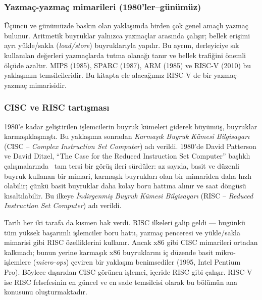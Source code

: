 \subsubsection*{Yazmaç-yazmaç mimarileri (1980'ler--günümüz)}
Üçüncü ve günümüzde baskın olan yaklaşımda birden çok genel amaçlı yazmaç bulunur. Aritmetik buyruklar yalnızca yazmaçlar arasında çalışır; bellek erişimi ayrı yükle/sakla (\emph{load/store}) buyruklarıyla yapılır. Bu ayrım, derleyiciye sık kullanılan değerleri yazmaçlarda tutma olanağı tanır ve bellek trafiğini önemli ölçüde azaltır. MIPS (1985), SPARC (1987), ARM (1985) ve RISC-V (2010) bu yaklaşımın temsilcileridir. Bu kitapta ele alacağımız RISC-V de bir yazmaç-yazmaç mimarisidir.

\subsubsection*{CISC ve RISC tartışması}
1980'e kadar geliştirilen işlemcilerin buyruk kümeleri giderek büyümüş, buyruklar karmaşıklaşmıştı. Bu yaklaşıma sonradan \emph{Karmaşık Buyruk Kümesi Bilgisayarı} (CISC -- \emph{Complex Instruction Set Computer}) adı verildi. 1980'de David Patterson ve David Ditzel, ``The Case for the Reduced Instruction Set Computer'' başlıklı çalışmalarında~\cite{patterson1980} tam tersi bir görüş ileri sürdüler: az sayıda, basit ve düzenli buyruk kullanan bir mimari, karmaşık buyrukları olan bir mimariden daha hızlı olabilir; çünkü basit buyruklar daha kolay boru hattına alınır ve saat döngüsü kısaltılabilir. Bu ilkeye \emph{İndirgenmiş Buyruk Kümesi Bilgisayarı} (RISC -- \emph{Reduced Instruction Set Computer}) adı verildi.

Tarih her iki tarafa da kısmen hak verdi. RISC ilkeleri galip geldi --- bugünkü tüm yüksek başarımlı işlemciler boru hattı, yazmaç penceresi ve yükle/sakla mimarisi gibi RISC özelliklerini kullanır. Ancak x86 gibi CISC mimarileri ortadan kalkmadı; bunun yerine karmaşık x86 buyruklarını iç düzende basit mikro-işlemlere (\emph{micro-ops}) çeviren bir yaklaşım benimsediler (1995, Intel Pentium Pro). Böylece dışarıdan CISC görünen işlemci, içeride RISC gibi çalışır. RISC-V ise RISC felsefesinin en güncel ve en sade temsilcisi olarak bu bölümün ana konusunu oluşturmaktadır.

